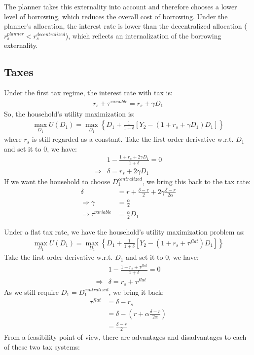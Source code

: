 \documentclass[a4paper,12pt]{article} %
\theoremstyle{nonitalic}
\begin{document}
The planner takes this externality into account and therefore chooses a lower level of borrowing, 
which reduces the overall cost of borrowing. 
Under the planner's allocation, the interest rate is lower than the decentralized allocation ($r_s^{planner} < r_s^{decentralized}$),
which reflects an internalization of the borrowing externality.

\subsection{Taxes}
Under the first tax regime, the interest rate with tax is:
\begin{gather*}
    r_s + \tau^{variable} = r_s + \gamma D_1
\end{gather*}
So, the household's utility maximization is:
\begin{gather*}
    \max_{D_1} U(D_1) = \max_{D_1} \left\{ D_1 + \frac{1}{1 + \delta} \left[ Y_2 - (1 + r_s + \gamma D_1)D_1 \right] \right\} 
\end{gather*}
where $r_s$ is still regarded as a constant.
Take the first order derivative w.r.t. $D_1$ and set it to 0, we have:
\begin{align*}
    & 1 - \frac{1 + r_s + 2 \gamma D_1}{1+\delta} = 0 \\
    \Rightarrow & \delta = r_s + 2 \gamma D_1 
\end{align*}
If we want the household to choose $D_1^{centralized}$, we bring this back to the tax rate:
\begin{align*}
    \delta &= r + \frac{\delta - r}{2} + 2 \gamma \frac{\delta - r}{2 \alpha} \\
    \Rightarrow \gamma &= \frac{\alpha}{2} \\
    \Rightarrow \tau^{variable} &= \frac{\alpha}{2} D_1
\end{align*}

Under a flat tax rate, we have the household's utility maximization problem as:
\begin{gather*}
    \max_{D_1} U(D_1) = \max_{D_1} \left\{ D_1 + \frac{1}{1 + \delta} \left[ Y_2 - (1 + r_s + \tau^{flat})D_1 \right] \right\}
\end{gather*}
Take the first order derivative w.r.t. $D_1$ and set it to 0, we have:
\begin{align*}
    & 1 - \frac{1 + r_s + \tau^{flat}}{1 + \delta} = 0 \\
    \Rightarrow & \delta = r_s + \tau^{flat}
\end{align*}
As we still require $D_1 = D_1^{centralized}$, we bring it back:
\begin{align*}
    \tau^{flat} &= \delta - r_s \\
    &= \delta - (r + \alpha \frac{\delta - r}{2 \alpha}) \\
    &= \frac{\delta - r}{2}
\end{align*}
From a feasibility point of view, there are advantages and disadvantages to each of these two tax systems: 
\end{document}
